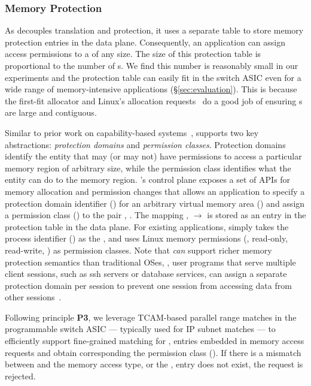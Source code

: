 \subsubsection{Memory Protection}
\label{sssec:mem_prot}

As \mind decouples translation and protection, it uses a separate table to store memory protection entries in the data plane. 
Consequently, an application can assign access permissions to a  of any size.
The size of this protection table is proportional to the number of s. We find this number is reasonably small in our experiments and the protection table can easily fit in the switch ASIC even for a wide range of memory-intensive applications (\S\ref{sec:evaluation}). This is because the first-fit allocator and Linux's  allocation requests~\cite{glibc-alloc} do a good job of ensuring s are large and contiguous. 

 Similar to prior work on capability-based systems~\cite{cheri, capabilityaddr}, \mind supports two key abstractions: \textit{protection domains} and \textit{permission classes}. Protection domains identify the entity that may (or may not) have permissions to access a particular memory region of arbitrary size, while the permission class identifies what the entity can do to the memory region. 
\mind's control plane exposes a set of APIs for memory allocation and permission changes that allows an application to specify a protection domain identifier () for an arbitrary virtual memory area () and assign a permission class () to the pair , . 
The mapping ,  $\rightarrow$  is stored as an entry in the protection table in the data plane. For existing applications, \mind simply takes the process identifier () as the ,  and uses Linux memory permissions (\eg, read-only, read-write, \etc) as permission classes. Note that \mind \textit{can} support richer memory protection semantics than traditional OSes, \eg, user programs that serve multiple client sessions, such as ssh servers or database services, can assign a separate protection domain per session to prevent one session from accessing data from other sessions~\cite{cheri}. 

Following principle \textbf{P3}, we leverage TCAM-based parallel range matches in the programmable switch ASIC --- typically used for IP subnet matches --- to efficiently support fine-grained matching for ,  entries embedded in memory access requests and obtain corresponding the permission class (). If there is a mismatch between  and the memory access type, or the ,  entry does not exist, the request is rejected.

